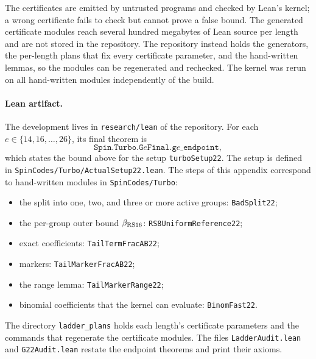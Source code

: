 The certificates are emitted by untrusted programs and checked by Lean's
kernel; a wrong certificate fails to check but cannot prove a false bound.
The generated certificate modules reach several hundred megabytes of Lean
source per length and are not stored in the repository. The repository
instead holds the generators, the per-length plans that fix every
certificate parameter, and the hand-written lemmas, so the modules can
be regenerated and rechecked\repositorycite. The kernel was rerun on all
hand-written modules independently of the build.

\paragraph{Lean artifact.}
The development lives in \nolinkurl{research/lean} of the
repository\repositorycite. For each $e\in\{14,16,\ldots,26\}$, its final
theorem is
\[
 \texttt{Spin.Turbo.G}e\texttt{Final.g}e\texttt{\_endpoint},
\]
which states the bound above for the setup \texttt{turboSetup22}. The setup
is defined in \nolinkurl{SpinCodes/Turbo/ActualSetup22.lean}.
The steps of this appendix correspond to hand-written modules in
\nolinkurl{SpinCodes/Turbo}:
\begin{itemize}
\item the split into one, two, and three or more active groups:
  \texttt{BadSplit22};
\item the per-group outer bound $\beta_{\rm RS16}$:
  \texttt{RS8UniformReference22};
\item exact coefficients: \texttt{TailTermFracAB22};
\item markers: \texttt{TailMarkerFracAB22};
\item the range lemma: \texttt{TailMarkerRange22};
\item binomial coefficients that the kernel can evaluate:
  \texttt{BinomFast22}.
\end{itemize}
The directory \nolinkurl{ladder_plans} holds each length's certificate
parameters and the commands that regenerate the certificate modules.
The files \texttt{LadderAudit.lean} and \texttt{G22Audit.lean} restate the
endpoint theorems and print their axioms.
